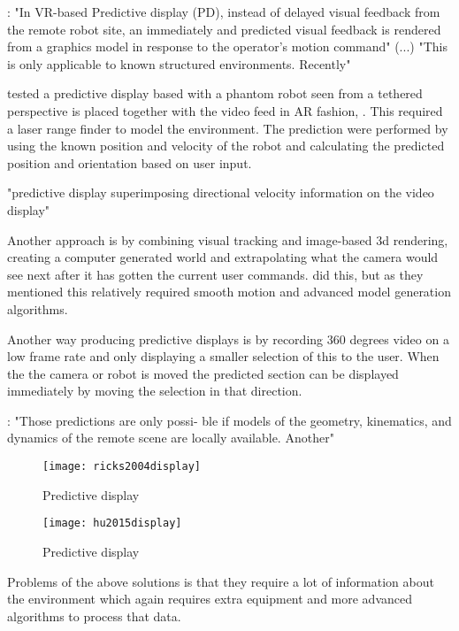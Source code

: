 \citep{Hu2016}: "In VR-based Predictive display (PD), instead of delayed visual feedback from the remote robot site, an immediately and predicted visual feedback is rendered from a graphics model in response to the operator's motion command" (...) "This is only applicable to known structured environments. Recently"

\citep{Ricks2004} tested a predictive display based with a phantom robot seen from a tethered perspective is placed together with the video feed in AR fashion, . This required a laser range finder to model the environment. The prediction were performed by using the known position and velocity of the robot and calculating the predicted position and orientation based on user input.

\citep{Mathan1996} "predictive display superimposing directional
velocity information on the video display"

Another approach is by combining visual tracking and image-based 3d rendering, creating a computer generated world and extrapolating what the camera would see next after it has gotten the current user commands. \citep{Hu2015} did this, but as they mentioned this relatively required smooth motion and advanced model generation algorithms.

Another way producing predictive displays is by recording 360 degrees video on a low frame rate and only displaying a smaller selection of this to the user. When the the camera or robot is moved the predicted section can be displayed immediately by moving the selection in that direction. \citep{Baldwin1999}

\citep{Burkert2004}: "Those predictions are only possi- ble if models of the geometry, kinematics, and dynamics of the remote scene are locally available. Another"

\begin{figure}[h!]
    \centering
    \texttt{[image: ricks2004display]}
    \caption{Predictive display \citep{Ricks2004}}
    \label{figRicks2004}
\end{figure}

\begin{figure}[h!]
    \centering
    \texttt{[image: hu2015display]}
    \caption{Predictive display \citep{Hu2015}}
\end{figure}

Problems of the above solutions is that they require a lot of information about the environment which again requires extra equipment and more advanced algorithms to process that data.

